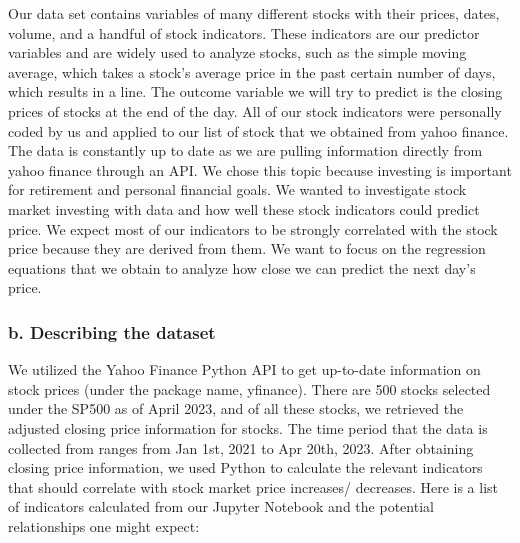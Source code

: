 \documentclass[
]{article}
\begin{document}
Our data set contains variables of many different stocks with their
prices, dates, volume, and a handful of stock indicators. These
indicators are our predictor variables and are widely used to analyze
stocks, such as the simple moving average, which takes a stock's average
price in the past certain number of days, which results in a line. The
outcome variable we will try to predict is the closing prices of stocks
at the end of the day. All of our stock indicators were personally coded
by us and applied to our list of stock that we obtained from yahoo
finance. The data is constantly up to date as we are pulling information
directly from yahoo finance through an API. We chose this topic because
investing is important for retirement and personal financial goals. We
wanted to investigate stock market investing with data and how well
these stock indicators could predict price. We expect most of our
indicators to be strongly correlated with the stock price because they
are derived from them. We want to focus on the regression equations that
we obtain to analyze how close we can predict the next day's price.

\hypertarget{b.-describing-the-dataset}{%
\subsubsection{b. Describing the
dataset}\label{b.-describing-the-dataset}}

We utilized the Yahoo Finance Python API to get up-to-date information
on stock prices (under the package name, yfinance). There are 500 stocks
selected under the SP500 as of April 2023, and of all these stocks, we
retrieved the adjusted closing price information for stocks. The time
period that the data is collected from ranges from Jan 1st, 2021 to Apr
20th, 2023. After obtaining closing price information, we used Python to
calculate the relevant indicators that should correlate with stock
market price increases/ decreases. Here is a list of indicators
calculated from our Jupyter Notebook and the potential relationships one
might expect:
\end{document}
